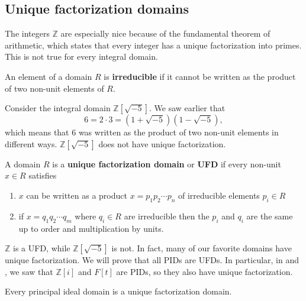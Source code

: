 
\subsection{Unique factorization domains}

The integers $\mathbb{Z}$ are especially nice because of the fundamental
theorem of arithmetic, which states that every integer has a unique
factorization into primes. This is not true for every integral domain.

\begin{definition} 
An element of a domain $R$ is \textbf{irreducible} if it cannot be written
as the product of two non-unit elements of $R$.
\end{definition} 

\begin{example} 
Consider the integral domain $\mathbb{Z}[\sqrt{-5}]$. We saw earlier that 
\[ 
6 = 2 \cdot 3 = (1 + \sqrt{-5})(1 - \sqrt{-5}),
\] 
which means that $6$ was written as the product of two non-unit elements in
different ways. $\mathbb{Z}[\sqrt{-5}]$ does not have unique factorization.
\end{example} 

\begin{definition} 
A domain $R$ is a \textbf{unique factorization domain} or \textbf{UFD} if every
non-unit $x \in R$ satisfies
\begin{enumerate}
\item $x$ can be written as a product $x = p_1 p_2 \cdots p_n$ of 
irreducible elements $p_i \in R$
\item if $x = q_1 q_2 \cdots q_m$ where $q_i \in R$ are irreducible
then the $p_i$ and $q_i$ are the same up to order and multiplication by units.
\end{enumerate}
\end{definition} 

\begin{example}
$\mathbb{Z}$ is a UFD, while $\mathbb{Z}[\sqrt{-5}]$ is not. In fact, many of
our favorite domains have unique factorization. We will prove that all PIDs 
are UFDs. In particular, in   and
, we saw that $\mathbb{Z}[i]$ and $F[t]$ are PIDs,
so they also have unique factorization.
\end{example}

\begin{theorem} \label{PIDUFD} 
Every principal ideal domain is a unique factorization domain.
\end{theorem} 

